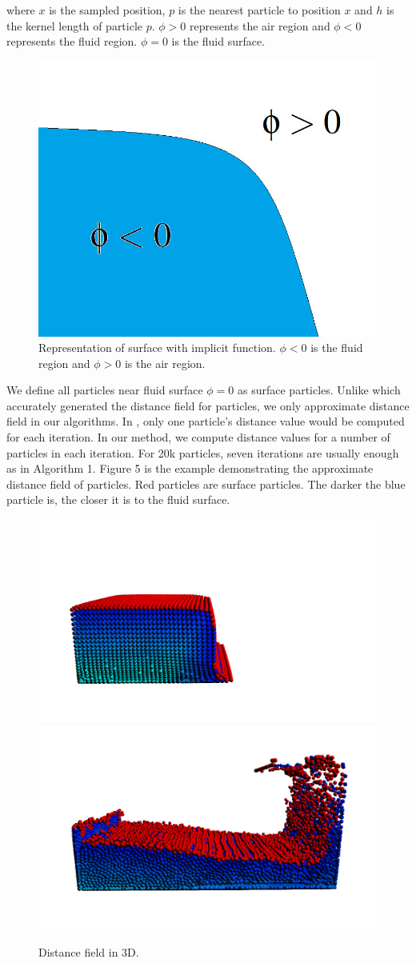 \noindent where $x$ is the sampled position, $p$ is the nearest
particle to position $x$ and $h$ is the kernel length of particle $p$.
$\phi > 0$ represents the air region and $\phi < 0$ represents the
fluid region. $\phi = 0$ is the fluid surface.

\begin{figure}[htb]
  \centering
  \includegraphics[width=.5\linewidth]{implicit}
  \caption{\label{fig:firstExample}
  Representation of surface with implicit function.
$\phi < 0$ is the fluid region and $\phi > 0$ is the air region.}
\end{figure}

We define all particles near fluid surface $\phi = 0$ as surface
particles. Unlike \cite{Adams:2007:ASP:1276377.1276437} which
accurately generated the distance
field for particles, we only approximate distance field in our algorithms.
In \cite{Adams:2007:ASP:1276377.1276437}, only one particle's distance
value would be computed for each iteration. In our method, we compute
distance values for a number of particles in each iteration.
For 20k particles, seven iterations are usually enough
as in Algorithm 1. Figure 5 is the example demonstrating the
approximate distance field of particles. Red particles are surface
particles. The darker the blue particle is, the closer
it is to the fluid surface.

\begin{figure}[htb]
  \centering
  \includegraphics[width=.4\linewidth]{dist-1}
  \includegraphics[width=.4\linewidth]{dist-2}
  \caption{\label{fig:firstExample}
           Distance field in 3D.}
\end{figure}

